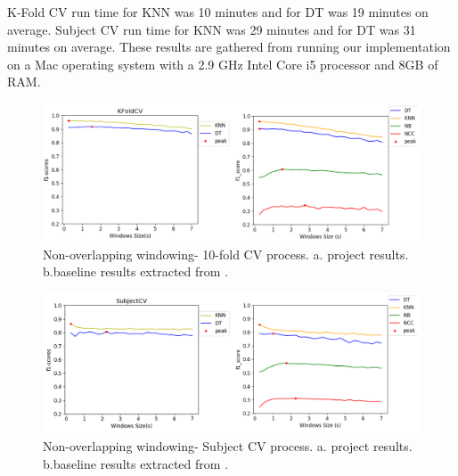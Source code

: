 \documentclass[12pt, a4paper]{article}
\begin{document}
K-Fold CV run time for KNN was 10 minutes and for DT was 19 minutes on average. Subject CV run time for KNN was 29 minutes and for DT was 31 minutes on average. These results are gathered from running our implementation on a Mac operating system with a 2.9 GHz Intel Core i5 processor and 8GB of RAM.

\begin{figure}[htpb!] 
    \centering 
\includegraphics[scale=0.35]{figure/KFOLD.jpg} 
    \caption{Non-overlapping windowing- 10-fold CV process. a. project results. b.baseline results extracted from \cite{dehghani} .} 
    \label{fig:kfold}
\end{figure}

\begin{figure}[htpb!] 
    \centering 
\includegraphics[scale=0.35]{figure/subject.jpg}
    \caption{Non-overlapping windowing- Subject CV process. a. project results. b.baseline results extracted from \cite{dehghani} .}
    \label{fig:subject}
\end{figure}
\end{document}
